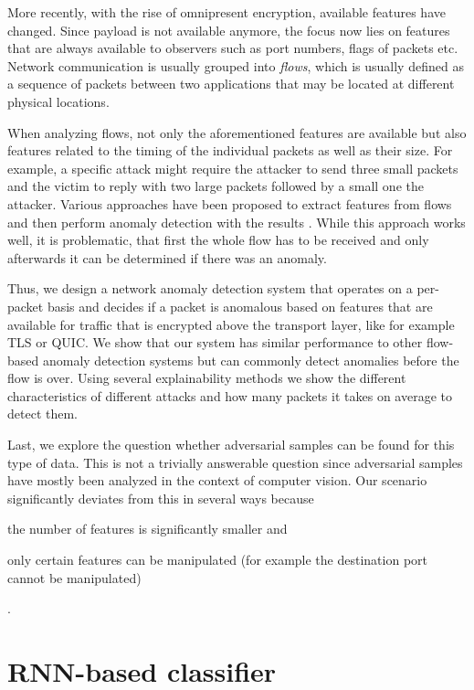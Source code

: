 \documentclass[sigconf,nonacm]{acmart}
\begin{document}
More recently, with the rise of omnipresent encryption, available features have changed. Since payload is not available anymore, the focus now lies on features that are always available to observers such as port numbers, flags of packets etc. Network communication is usually grouped into \textit{flows}, which is usually defined as a sequence of packets between two applications that may be located at different physical locations. 

When analyzing flows, not only the aforementioned features are available but also features related to the timing of the individual packets as well as their size. For example, a specific attack might require the attacker to send three small packets and the victim to reply with two large packets followed by a small one the attacker. Various approaches have been proposed to extract features from flows and then perform anomaly detection with the results \cite{meghdouri_analysis_2018}. While this approach works well, it is problematic, that first the whole flow has to be received and only afterwards it can be determined if there was an anomaly. 

Thus, we design a network anomaly detection system that operates on a per-packet basis and decides if a packet is anomalous based on features that are available for traffic that is encrypted above the transport layer, like for example TLS or QUIC. 
We show that our system has similar performance to other flow-based anomaly detection systems but can commonly detect anomalies before the flow is over. Using several explainability methods we show the different characteristics of different attacks and how many packets it takes on average to detect them. 

Last, we explore the question whether adversarial samples can be found for this type of data. This is not a trivially answerable question since adversarial samples have mostly been analyzed in the context of computer vision. Our scenario significantly deviates from this in several ways because \begin{enumerate*}
\item the number of features is significantly smaller and
\item only certain features can be manipulated (for example the destination port cannot be manipulated)
\end{enumerate*}.

\section{RNN-based classifier}
\end{document}
